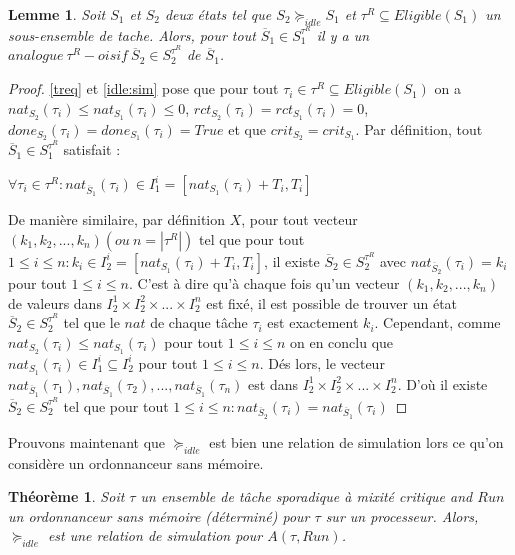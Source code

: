 \documentclass[11pt,a4paper,oneside]{book}
\theoremstyle{break}
\theoremstyle{breakplain}
\newtheorem{theo}{Théorème}
\newtheorem{lem}{Lemme}
\begin{document}
\begin{lem}
\label{reqanalogueeq}
Soit $S_1$ et $S_2$ deux états tel que $S_2 \succeq_{idle} S_1$ et $\tau^R \subseteq Eligible(S_1)$ un sous-ensemble de tache. Alors, pour tout $\overline{S}_1 \in S_1^{\tau^R}$ il y a un $analogue\ \tau^R-oisif\ \overline{S}_2 \in S_2^{\tau^R}$ de $\overline{S}_1$.
\end{lem}
\begin{proof}
\autoref{treq} et \autoref{idle:sim} pose que pour tout $\tau_i \in \tau^R \subseteq Eligible(S_1)$ on a $nat_{S_2}(\tau_i) \leq nat_{S_1}(\tau_i) \leq 0$, $rct_{S_2}(\tau_i) = rct_{S_1}(\tau_i) = 0$, $done_{S_2}(\tau_i) = done_{S_1}(\tau_i) = True$ et que $crit_{S_2} = crit_{S_1}$. Par définition, tout $\overline{S}_1 \in S^{\tau^R}_1$ satisfait :
\begin{center}
$\forall \tau_i \in \tau^R : nat_{\overline{S}_1}(\tau_i) \in I^i_1=[nat_{S_1}(\tau_i)+T_i, T_i] $
\end{center}
De manière similaire, par définition $X$, pour tout vecteur $(k_1, k_2, ..., k_n)(ou\ n = |\tau^R|)$ tel que pour tout $1\leq i \leq n: k_i \in I^i_2=[nat_{S_1}(\tau_i)+T_i, T_i]$, il existe $\overline{S}_2\in S^{\tau^R}_2$ avec $nat_{\overline{S}_2}(\tau_i) = k_i$ pour tout $1\leq i \leq n$. C'est à dire qu'à chaque fois qu'un vecteur $(k_1, k_2, ..., k_n)$ de valeurs dans $I_2^1 \times I_2^2 \times ... \times I_2^n$ est fixé, il est possible de trouver un état $\overline{S}_2 \in S^{\tau^R}_2$ tel que le $nat$ de chaque tâche $\tau_i$ est exactement $k_i$. Cependant, comme $nat_{S_2}(\tau_i) \leq nat_{S_1}(\tau_i)$ pour tout $1\leq i \leq n$ on en conclu que $nat_{S_1}(\tau_i) \in I^i_1 \subseteq I^i_2$ pour tout $1\leq i \leq n$. Dés lors, le vecteur $nat_{\overline{S}_1}(\tau_1), nat_{\overline{S}_1}(\tau_2), ..., nat_{\overline{S}_1}(\tau_n)$ est dans $I_2^1 \times I_2^2 \times ... \times I_2^n$. D'où il existe $\overline{S}_2 \in S^{\tau^R}_2$ tel que pour tout $1\leq i \leq n : nat_{\overline{S}_2}(\tau_i) = nat_{\overline{S}_1}(\tau_i)$
\end{proof}


Prouvons maintenant que $\succeq_{idle}$ est bien une relation de simulation lors ce qu'on considère un ordonnanceur sans mémoire.

\begin{theo}
Soit $\tau$ un ensemble de tâche sporadique à mixité critique and $Run$ un ordonnanceur sans mémoire (déterminé) pour $\tau$ sur un processeur. Alors, $\succeq_{idle}$ est une relation de simulation pour $A(\tau, Run)$.
\end{theo}
\end{document}
